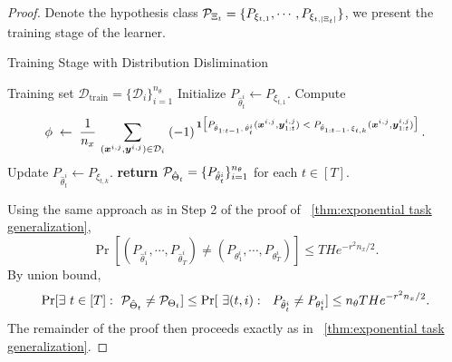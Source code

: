 \begin{proof}


Denote the hypothesis class ${\mathcal{P}}_{\Xi_t} = \{P_{\xi_{t,1}},\cdots, P_{\xi_{t,|\Xi_t|}}\}$, we present the training stage of the learner.

\begin{algorithm}[H]
\caption{Training Stage with Distribution Dislimination}
\begin{algorithmic}[1]
\Require Training set $\mathcal{D}_{\mathrm{train}}=\{\mathcal{D}_i\}_{i=1}^{n_\theta}$
      \State Initialize \(P_{\hat\theta_t^i} \gets P_{\xi_{t,1}}\). 
        \State Compute
          \[
          \phi 
          \;\leftarrow\; 
          \frac{1}{n_x}\,\sum_{(\bm x^{i,j},\bm y^{i,j})\in {\mathcal{D}}_i}
          \;(-1)^{\,\mathbf{1}\bigl[
            P_{\hat\theta_{1:t-1},\,\hat{\theta}_t^i}({\bm x}^{i,j},{\bm y}^{i,j}_{1:t})
            \;<\;
            P_{\hat\theta_{1:t-1},\,\xi_{t,k}}({\bm x}^{i,j},{\bm y}^{i,j}_{1:t})
          \bigr]}\,.
          \]
          \State Update \( P_{\hat{\theta}_t^i} \gets P_{\xi_{t,k}}\).
        \EndIf
      \EndFor
    \EndFor
\EndFor
\State \textbf{return} ${\mathcal{P}}_{\hat\Theta_t}=\{{P}_{\hat{\theta}_t^i}\}_{i=1}^{n_\theta}$ for each $t\in[T]$.
\end{algorithmic}
\end{algorithm}

Using the same approach as in Step 2 of the proof of ~\cref{thm:exponential task generalization}, 
\[
\Pr[(P_{\hat \theta^i_1},\cdots,P_{\hat \theta_T^i})\neq (P_{\theta^i_1},\cdots,P_{\theta_T^i})]\leq THe^{-{r^2 n_x}/2}.
\]
By union bound, 
\begin{align*}
\Pr[\exists ~t \in [T]:~ {\mathcal{P}}_{\hat \Theta_t} \neq {\mathcal{P}}_{\Theta_t }]\leq \Pr[~\exists (t,i):~ ~P_{\hat \theta^i_t}\neq P_{\theta^i_t}]\leq n_\theta T He^{-r^2 n_x/2}.
\end{align*}
The remainder of the proof then proceeds exactly as in ~\cref{thm:exponential task generalization}.

\end{proof}


